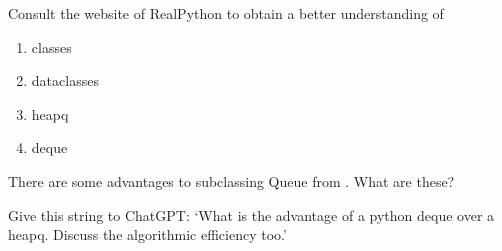 \documentclass[queueing-book.tex]{subfiles}
\begin{document}
\begin{exercise}
Consult the website of RealPython to obtain a better understanding of
\begin{enumerate}
\item classes
\item dataclasses
\item heapq
\item deque
\end{enumerate}
\end{exercise}

\begin{exercise}
There are some advantages to subclassing  Queue from . What are these?
\begin{solution}
Give this string to ChatGPT: `What is the advantage of a python deque over a heapq. Discuss the algorithmic efficiency too.'
\end{solution}
\end{exercise}



\end{document}
